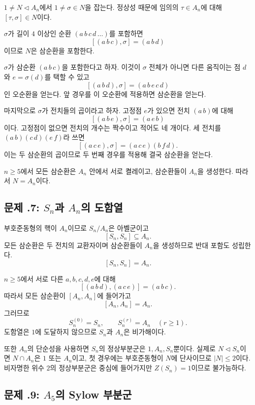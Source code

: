 \begin{solution}
$1\ne N\triangleleft A_n$에서 $1\ne\sigma\in N$을 잡는다. 정상성 때문에 임의의 $\tau\in A_n$에 대해 $[\tau,\sigma]\in N$이다.

$\sigma$가 길이 $4$ 이상인 순환 $(a\,b\,c\,d\,\dots)$를 포함하면
\[
  [(a\,b\,c),\sigma]=(a\,b\,d)
\]
이므로 $N$은 삼순환을 포함한다.

$\sigma$가 삼순환 $(a\,b\,c)$을 포함한다고 하자. 이것이 $\sigma$ 전체가 아니면 다른 움직이는 점 $d$와 $e=\sigma(d)$를 택할 수 있고
\[
  [(a\,b\,d),\sigma]=(a\,b\,e\,c\,d)
\]
인 오순환을 얻는다. 앞 경우를 이 오순환에 적용하면 삼순환을 얻는다.

마지막으로 $\sigma$가 전치들의 곱이라고 하자. 고정점 $e$가 있으면 전치 $(a\,b)$에 대해
\[
  [(a\,b\,e),\sigma]=(a\,e\,b)
\]
이다. 고정점이 없으면 전치의 개수는 짝수이고 적어도 네 개이다. 세 전치를 $(a\,b)(c\,d)(e\,f)$라 쓰면
\[
  [(a\,c\,e),\sigma]=(a\,c\,e)(b\,f\,d).
\]
이는 두 삼순환의 곱이므로 두 번째 경우를 적용해 결국 삼순환을 얻는다.

$n\ge5$에서 모든 삼순환은 $A_n$ 안에서 서로 켤레이고, 삼순환들이 $A_n$을 생성한다. 따라서 $N=A_n$이다.
\end{solution}

\subsection*{문제 \thechapter.7: $S_n$과 $A_n$의 도함열}

\begin{solution}
부호준동형의 핵이 $A_n$이므로 $S_n/A_n$은 아벨군이고
\[
  [S_n,S_n]\subseteq A_n.
\]
모든 삼순환은 두 전치의 교환자이며 삼순환들이 $A_n$을 생성하므로 반대 포함도 성립한다.
\[
  [S_n,S_n]=A_n.
\]

$n\ge5$에서 서로 다른 $a,b,c,d,e$에 대해
\[
  [(a\,b\,d),(a\,c\,e)]=(a\,b\,c).
\]
따라서 모든 삼순환이 $[A_n,A_n]$에 들어가고
\[
  [A_n,A_n]=A_n.
\]
그러므로
\[
  S_n^{(0)}=S_n,
  \qquad
  S_n^{(r)}=A_n\quad(r\ge1).
\]
도함열은 $1$에 도달하지 않으므로 $S_n$과 $A_n$은 비가해이다.

또한 $A_n$의 단순성을 사용하면 $S_n$의 정상부분군은 $1,A_n,S_n$뿐이다. 실제로 $N\triangleleft S_n$이면 $N\cap A_n$은 $1$ 또는 $A_n$이고, 첫 경우에는 부호준동형이 $N$에 단사이므로 $|N|\le2$이다. 비자명한 위수 $2$의 정상부분군은 중심에 들어가지만 $Z(S_n)=1$이므로 불가능하다.
\end{solution}

\subsection*{문제 \thechapter.9: $A_5$의 Sylow 부분군}

